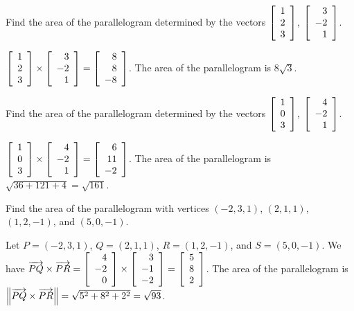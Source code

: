 \documentclass{ximera}
\begin{document}
  
  \begin{example}
    Find the area of the parallelogram determined by the vectors
    $\startmat{r}
      1 \\
      2 \\
      3
    \stopmat$, $\startmat{r}
      3 \\
      -2 \\
      1
    \stopmat$.
    \begin{solution}
      $\startmat{r}
        1 \\
        2 \\
        3
      \stopmat \times
      \startmat{r}
        3 \\
        -2 \\
        1
      \stopmat = \startmat{r}
        8 \\
        8 \\
        -8
      \stopmat$. The area of the parallelogram is $8\sqrt{3}$.
    \end{solution}
  \end{example}
  
  \begin{example}
    Find the area of the parallelogram determined by the vectors
    $\startmat{r}
      1 \\
      0 \\
      3
    \stopmat$, $\startmat{r}
      4 \\
      -2 \\
      1
    \stopmat$.
    \begin{solution}
      $\startmat{r}
        1 \\
        0 \\
        3
      \stopmat \times
      \startmat{r}
        4 \\
        -2 \\
        1
      \stopmat = \startmat{r}
        6 \\
        11 \\
        -2
      \stopmat$. The area of the parallelogram is
      $\sqrt{36+121+4}=\sqrt{161}$. 
    \end{solution}
  \end{example}
  
  \begin{example}
    Find the area of the parallelogram with vertices $(-2,3,1)$,
    $(2,1,1)$, $(1,2,-1)$, and $(5,0,-1)$.
    \begin{solution}
      Let $P=(-2,3,1)$, $Q=(2,1,1)$, $R=(1,2,-1)$, and $S=(5,0,-1)$.
      We have
      $\longvect{PQ}\times\longvect{PR}
      =
      \startmat{r} 4 \\ -2 \\ 0 \stopmat
      \times
      \startmat{r} 3 \\ -1 \\ -2 \stopmat
      =
      \startmat{r} 5 \\ 8 \\ 2 \stopmat$.
      The area of the parallelogram is
      $\norm{\longvect{PQ}\times\longvect{PR}} = \sqrt{5^2+8^2+2^2} =
      \sqrt{93}$.
    \end{solution}
  \end{example}
  
\end{document}

